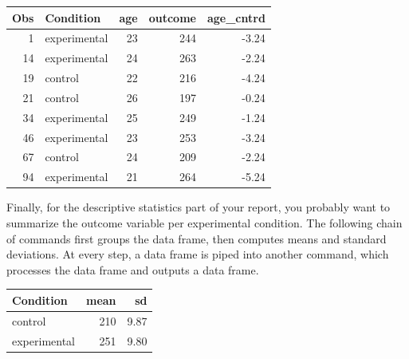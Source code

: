 \documentclass[]{svmono}
\newenvironment{Shaded}{\begin{snugshade}}{\end{snugshade}}
\newcommand{\KeywordTok}[1]{\textcolor[rgb]{0.13,0.29,0.53}{\textbf{#1}}}
\newcommand{\DataTypeTok}[1]{\textcolor[rgb]{0.13,0.29,0.53}{#1}}
\newcommand{\StringTok}[1]{\textcolor[rgb]{0.31,0.60,0.02}{#1}}
\newcommand{\OperatorTok}[1]{\textcolor[rgb]{0.81,0.36,0.00}{\textbf{#1}}}
\newcommand{\NormalTok}[1]{#1}
\theoremstyle{definition}
\theoremstyle{definition}
\theoremstyle{definition}
\theoremstyle{remark}
\begin{document}
\begin{Shaded}
\end{Shaded}

\begin{longtable}[]{@{}rlrrr@{}}
\toprule
Obs & Condition & age & outcome & age\_cntrd\tabularnewline
\midrule
\endhead
1 & experimental & 23 & 244 & -3.24\tabularnewline
14 & experimental & 24 & 263 & -2.24\tabularnewline
19 & control & 22 & 216 & -4.24\tabularnewline
21 & control & 26 & 197 & -0.24\tabularnewline
34 & experimental & 25 & 249 & -1.24\tabularnewline
46 & experimental & 23 & 253 & -3.24\tabularnewline
67 & control & 24 & 209 & -2.24\tabularnewline
94 & experimental & 21 & 264 & -5.24\tabularnewline
\bottomrule
\end{longtable}

Finally, for the descriptive statistics part of your report, you
probably want to summarize the outcome variable per experimental
condition. The following chain of commands first groups the data frame,
then computes means and standard deviations. At every step, a data frame
is piped into another command, which processes the data frame and
outputs a data frame.

\begin{Shaded}
\end{Shaded}

\begin{tabular}{l|r|r}
\hline
Condition & mean & sd\\
\hline
control & 210 & 9.87\\
\hline
experimental & 251 & 9.80\\
\hline
\end{tabular}
\end{document}
